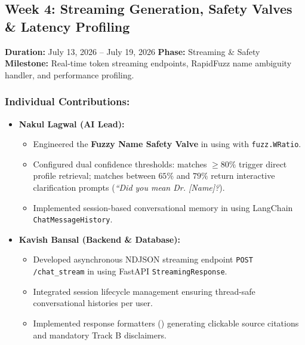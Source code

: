 \documentclass[11pt,a4paper]{article}
\begin{document}
\newpage
\subsection*{Week 4: Streaming Generation, Safety Valves \& Latency Profiling}
\noindent \textbf{Duration:} July 13, 2026 -- July 19, 2026 \hfill \textbf{Phase:} Streaming \& Safety \\
\textbf{Milestone:} Real-time token streaming endpoints, RapidFuzz name ambiguity handler, and performance profiling.

\subsubsection*{Individual Contributions:}
\begin{itemize}
    \setlength{\itemsep}{1pt}
    \item \textbf{Nakul Lagwal (AI Lead):}
    \begin{itemize}
        \setlength{\itemsep}{0pt}
        \item Engineered the \textbf{Fuzzy Name Safety Valve} in  using  with \texttt{fuzz.WRatio}.
        \item Configured dual confidence thresholds: matches $\ge 80\%$ trigger direct profile retrieval; matches between $65\%$ and $79\%$ return interactive clarification prompts (\textit{``Did you mean Dr. [Name]?}).
        \item Implemented session-based conversational memory in  using LangChain \texttt{ChatMessageHistory}.
    \end{itemize}

    \item \textbf{Kavish Bansal (Backend \& Database):}
    \begin{itemize}
        \setlength{\itemsep}{0pt}
        \item Developed asynchronous NDJSON streaming endpoint \texttt{POST /chat\_stream} in  using FastAPI \texttt{StreamingResponse}.
        \item Integrated session lifecycle management ensuring thread-safe conversational histories per user.
        \item Implemented response formatters () generating clickable source citations and mandatory Track B disclaimers.
    \end{itemize}


\end{itemize}
\end{document}
